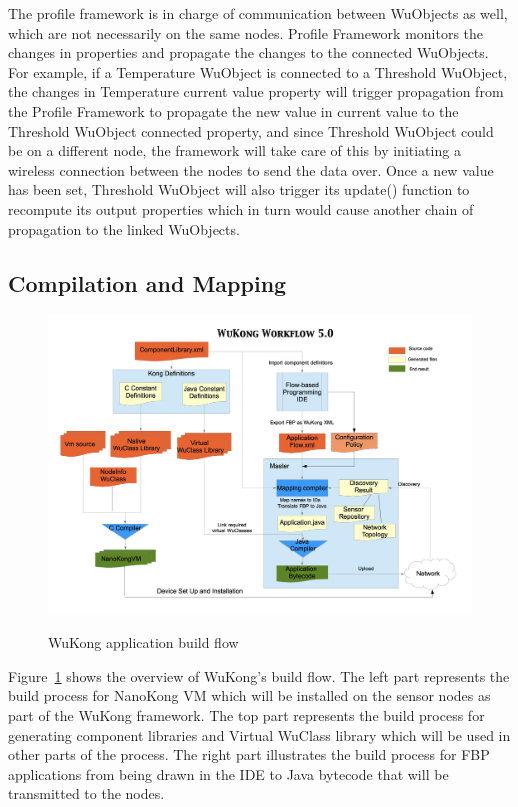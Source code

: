 The profile framework is in charge of communication between WuObjects as
well, which are not necessarily on the same nodes. Profile Framework monitors
the changes in properties and propagate the changes to the connected WuObjects.
For example, if a Temperature WuObject is connected to a Threshold WuObject,
the changes in Temperature current value property will trigger propagation from
the Profile Framework to propagate the new value in current value to the
Threshold WuObject connected property, and since Threshold WuObject could be on
a different node, the framework will take care of this by initiating
a wireless connection between the nodes to send the data over. Once a new value
has been set, Threshold WuObject will also trigger its update() function to
recompute its output properties which in turn would cause another chain of
propagation to the linked WuObjects.

\subsection{Compilation and Mapping}

\begin{figure}[h!]
\caption{WuKong application build flow}
\centering
    \includegraphics[width=\linewidth]{figures/wukong-flow}
\label{fig:wukong-flow}
\end{figure}

Figure~\ref{fig:wukong-flow} shows the overview of WuKong's build flow. The
left part represents the build process for NanoKong VM which will be installed
on the sensor nodes as part of the WuKong framework. The top part represents
the build process for generating component libraries and Virtual WuClass
library which will be used in other parts of the process. The right part
illustrates the build process for FBP applications from being drawn in the IDE
to Java bytecode that will be transmitted to the nodes.

